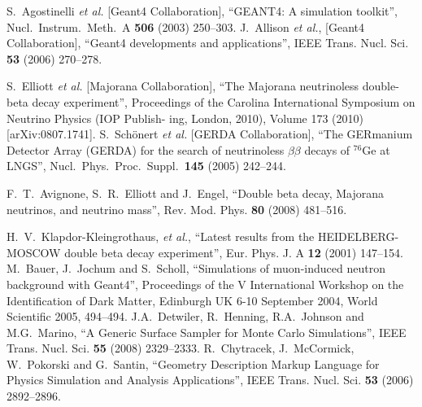 \documentclass[article]{IEEEtran}
\begin{document}
\ifCLASSOPTIONcaptionsoff
  \newpage
\fi

\begin{thebibliography}{1}

  S.~Agostinelli {\it et al.}  [{\sc Geant4} Collaboration],
  ``GEANT4: A simulation toolkit'',
  Nucl.\ Instrum.\ Meth.\ A {\bf 506} (2003) 250--303.
%
 J.~Allison {\it et al.}, [{\sc Geant4} Collaboration],
 ``Geant4 developments and applications'',
  IEEE Trans. Nucl. Sci. \textbf{53} (2006) 270--278.

  S.~Elliott {\it et al.}  [Majorana Collaboration],
  ``The Majorana neutrinoless double-beta decay experiment'',
  Proceedings of the Carolina International Symposium on Neutrino Physics (IOP Publish-
ing, London, 2010), Volume 173 (2010) [arXiv:0807.1741].
%
  S.~Sch\"onert {\it et al.} [GERDA Collaboration],
``The GERmanium Detector Array (GERDA) for the search of neutrinoless $\beta \beta$ decays of $^{76}$Ge at LNGS'',
  Nucl.\ Phys.\ Proc.\ Suppl.\  {\bf 145} (2005) 242--244.

%
  F.~T.~Avignone, S.~R.~Elliott and J.~Engel,
 ``Double beta decay, Majorana neutrinos, and neutrino mass'',
  Rev. Mod. Phys. \textbf{80} (2008) 481--516.

% 
  H.~V.~Klapdor-Kleingrothaus, {\it et al.},
  ``Latest results from the HEIDELBERG-MOSCOW double beta decay experiment'',
  Eur. Phys. J. A {\bf 12} (2001) 147--154.
%
  M.~Bauer, J.~Jochum and S.~Scholl,
 ``Simulations of muon-induced neutron background with Geant4'',
 Proceedings of the V International Workshop on the Identification of Dark Matter,
Edinburgh UK 6-10 September 2004, World Scientific 2005, 494--494.
%
J.A.~Detwiler, R.~Henning, R.A.~Johnson and M.G.~Marino,
``A Generic Surface Sampler for Monte Carlo Simulations'',
IEEE Trans. Nucl. Sci. {\bf 55} (2008) 2329--2333.
%
R.~Chytracek, J.~McCormick, W.~Pokorski and G.~Santin,
``Geometry Description Markup Language for Physics Simulation and Analysis Applications'',
IEEE Trans. Nucl. Sci. \textbf{53} (2006) 2892--2896.


\end{thebibliography}
\end{document}
